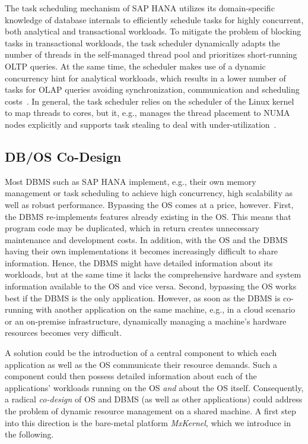 \documentclass[11pt]{article}
\begin{document}
The task scheduling mechanism of SAP HANA utilizes its domain-specific knowledge of database internals to efficiently schedule tasks for highly concurrent, both analytical and transactional workloads.
To mitigate the problem of blocking tasks in transactional workloads, the task scheduler dynamically adapts the number of threads in the self-managed thread pool and prioritizes short-running OLTP queries.
At the same time, the scheduler makes use of a dynamic concurrency hint for analytical workloads, which results in a lower number of tasks for OLAP queries avoiding synchronization, communication and scheduling costs~\cite{nollhrm19:PsaroudakisSMA13}.
In general, the task scheduler relies on the scheduler of the Linux kernel to map threads to cores, but it, e.g., manages the thread placement to NUMA nodes explicitly and supports task stealing to deal with under-utilization~\cite{nollhrm19:Psaroudakis:2016:AND:3015274.3015275}.





\subsection{DB/OS Co-Design}
Most DBMS such as SAP HANA implement, e.g., their own memory management or task scheduling to achieve high concurrency, high scalability as well as robust performance.
Bypassing the OS comes at a price, however.
First, the DBMS re-implements features already existing in the OS.
This means that program code may be duplicated, which in return creates unnecessary maintenance and development costs.
In addition, with the OS and the DBMS having their own implementations it becomes increasingly difficult to share information.
Hence, the DBMS might have detailed information about its workloads, but at the same time it lacks the comprehensive hardware and system information available to the OS and vice versa.
Second, bypassing the OS works best if the DBMS is the only application.
However, as soon as the DBMS is co-running with another application on the same machine, e.g., in a cloud scenario or an on-premise infrastructure, dynamically managing a machine's hardware resources becomes very difficult.

A solution could be the introduction of a central component to which each application as well as the OS communicate their resource demands.
Such a component could then possess detailed information about each of the applications' workloads running on the OS \emph{and} about the OS itself.
Consequently, a radical \emph{co-design} of OS and DBMS (as well as other applications) could address the problem of dynamic resource management on a shared machine.
A first step into this direction is the bare-metal platform \emph{MxKernel}, which we introduce in the following.
\end{document}
